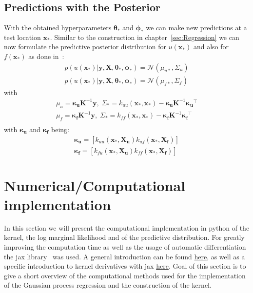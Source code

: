 \documentclass{article}
\begin{document}
\subsection{Predictions with the Posterior}
With the obtained hyperparameters $\bm{\theta_*}$ and $\bm{\phi_*}$ we can make
new predictions at a test location $\bm{x_*}$. Similar to the construction in
chapter~\ref{sec:Regression} we can now formulate the predictive posterior
distribution for $u(\bm{x_*})$ and also for $f(\bm{x_*})$ as done
in~\cite{RAISSI}:
\begin{equation}
    \begin{aligned}
        p(u(\bm{x_*})|\bm{y},\bm{X},\bm{\theta_*}, \bm{\phi_*}) = \mathcal{N}(\mu_{u*}, \Sigma_u) \\
        p(u(\bm{x_*})|\bm{y},\bm{X},\bm{\theta_*}, \bm{\phi_*}) = \mathcal{N}(\mu_{f*}, \Sigma_f)
    \end{aligned}
\end{equation}
with
\begin{equation}
    \begin{aligned}
        \label{eq:predictive_mean_cov}
        \mu_u = \bm{\kappa_u}\bm{K}^{-1}\bm{y}, \; \Sigma_* = k_{uu}(\bm{x_*,x_*}) - \bm{\kappa_u}\bm{K}^{-1}\bm{\kappa_u}^\intercal  \\
        \mu_f = \bm{\kappa_f}\bm{K}^{-1}\bm{y}, \;  \Sigma_* = k_{ff}(\bm{x_*,x_*}) - \bm{\kappa_f}\bm{K}^{-1}\bm{\kappa_f}^\intercal \\
    \end{aligned}
\end{equation}
with $\bm{\kappa_u}$ and $\bm{\kappa_f}$ being:
\begin{equation}
    \begin{aligned}
        \bm{\kappa_u} = [k_{uu}(\bm{x_*},\bm{X_u})k_{uf}(\bm{x_*,\bm{X_f}})] \\
        \bm{\kappa_f} = [k_{fu}(\bm{x_*},\bm{X_u})k_{ff}(\bm{x_*,\bm{X_f}})]
    \end{aligned}
\end{equation}


\section{Numerical/Computational implementation}
In this section we will present the computational implementation in python of the kernel, the log marginal likelihood and of the predictive distribution. For greatly improving the computation time as well as the usage of automatic differentiation the jax library~\cite{jax2018github} was used. A general introduction can be found \href{https://jax.readthedocs.io/en/latest/notebooks/quickstart.html}{here}, as well as a specific introduction to kernel derivatives with jax \href{https://jejjohnson.github.io/research_notebook/content/notes/kernels/kernel_derivatives.html}{here}. Goal of this section is to give a short overview of the computational methods used for the implementation of the Gaussian process regression and the construction of the kernel.\\
\end{document}
